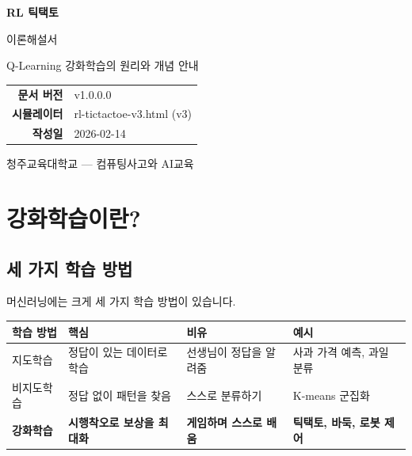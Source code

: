 \documentclass[11pt,a4paper]{article}
\begin{document}
\begin{titlepage}
\centering
\vspace*{3cm}
{\fontsize{48pt}{50pt}\selectfont {}}
\vspace{1cm}

{\Huge\bfseries\color{mainblue} RL 틱택토}
\vspace{0.3cm}

{\LARGE\color{darkbrown} 이론해설서}
\vspace{1.5cm}

{\large Q-Learning 강화학습의 원리와 개념 안내}
\vspace{3cm}

\begin{tabular}{rl}
\textbf{문서 버전} & v1.0.0.0 \\
\textbf{시뮬레이터} & rl-tictactoe-v3.html (v3) \\
\textbf{작성일} & 2026-02-14 \\
\end{tabular}
\vfill
{\small\color{lightbrown} 청주교육대학교 — 컴퓨팅사고와 AI교육}
\end{titlepage}

\tableofcontents
\newpage

\section{강화학습이란?}

\subsection{세 가지 학습 방법}

머신러닝에는 크게 세 가지 학습 방법이 있습니다.

\begin{center}
\renewcommand{\arraystretch}{1.4}
\begin{tabular}{|l|l|l|l|}
\hline
\rowcolor{tableheader}
\textbf{학습 방법} & \textbf{핵심} & \textbf{비유} & \textbf{예시} \\
\hline
지도학습 & 정답이 있는 데이터로 학습 & 선생님이 정답을 알려줌 & 사과 가격 예측, 과일 분류 \\
\hline
비지도학습 & 정답 없이 패턴을 찾음 & 스스로 분류하기 & K-means 군집화 \\
\hline
\textbf{강화학습} & \textbf{시행착오로 보상을 최대화} & \textbf{게임하며 스스로 배움} & \textbf{틱택토, 바둑, 로봇 제어} \\
\hline
\end{tabular}
\end{center}
\end{document}
